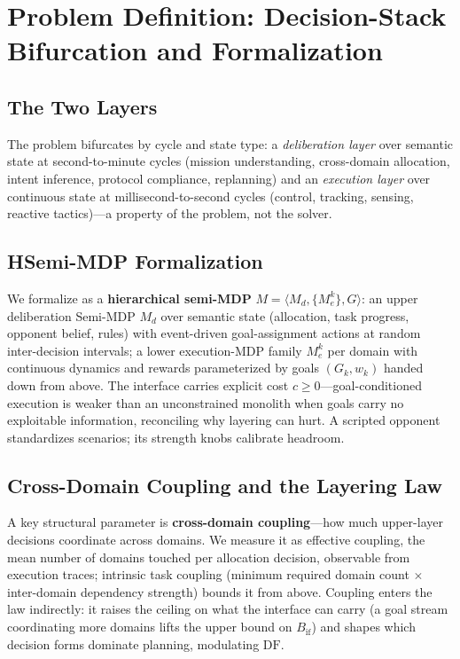\documentclass[sigconf,anonymous]{aamas}
\newcommand{\Bif}{B_{\mathrm{if}}}
\begin{document}
\section{Problem Definition: Decision-Stack Bifurcation and Formalization}\label{sec:formal}

\subsection{The Two Layers}\label{sec:layers}

The problem bifurcates by cycle and state type: a \emph{deliberation layer} over semantic state at second-to-minute cycles (mission understanding, cross-domain allocation, intent inference, protocol compliance, replanning) and an \emph{execution layer} over continuous state at millisecond-to-second cycles (control, tracking, sensing, reactive tactics)---a property of the problem, not the solver.

\subsection{HSemi-MDP Formalization}\label{sec:hsemimdp}

We formalize as a \textbf{hierarchical semi-MDP} $M = \langle M_d, \{M_e^k\}, G \rangle$: an upper deliberation Semi-MDP $M_d$ over semantic state (allocation, task progress, opponent belief, rules) with event-driven goal-assignment actions at random inter-decision intervals; a lower execution-MDP family $M_e^k$ per domain with continuous dynamics and rewards parameterized by goals $(G_k, w_k)$ handed down from above. The interface carries explicit cost $c \geq 0$---goal-conditioned execution is weaker than an unconstrained monolith when goals carry no exploitable information, reconciling why layering can hurt. A scripted opponent standardizes scenarios; its strength knobs calibrate headroom.

\subsection{Cross-Domain Coupling and the Layering Law}\label{sec:law}

A key structural parameter is \textbf{cross-domain coupling}---how much upper-layer decisions coordinate across domains. We measure it as effective coupling, the mean number of domains touched per allocation decision, observable from execution traces; intrinsic task coupling (minimum required domain count $\times$ inter-domain dependency strength) bounds it from above. Coupling enters the law indirectly: it raises the ceiling on what the interface can carry (a goal stream coordinating more domains lifts the upper bound on $\Bif$) and shapes which decision forms dominate planning, modulating $\mathrm{DF}$.
\end{document}
